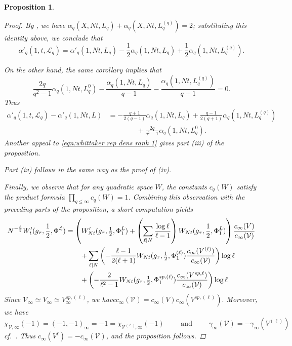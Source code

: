 \documentclass[reqno,oneside]{amsart}
\theoremstyle{plain}
\newtheorem{proposition}[theorem]{Proposition}
\theoremstyle{remark}
\numberwithin{theorem}{section}
\newcommand{\calL}{\mathcal L}
\newcommand{\calV}{\mathcal V}
\begin{document}
\begin{proposition}
\begin{proof}
			By \cite[Corollary 8.2]{YangLocal}, we have $\alpha_q(X, Nt, L_q) + \alpha_q(X, Nt, L_q^{(q)}) = 2$; substituting this identity above, we conclude that
			\begin{equation}
			\alpha'_q(1, t, \calL_q) = \alpha' _q(1, Nt, L_q) - \frac12 \alpha_q(1, Nt, L_q) + \frac12 \alpha_q(1, Nt, L^{(q)}_q).
			\end{equation}
			
			On the other hand, the same corollary implies that
			\begin{equation}
			\frac{2q }{q^2-1} \alpha_q(1, Nt, L^0_q) -  \frac{\alpha_q(1, Nt, L_q )}{q-1} -  \frac{\alpha_q(1, Nt, L_q^{(q)})}{q+1} = 0.
			\end{equation}
			Thus
			\begin{align}
			\alpha'_q(1, t, \calL_q) - \alpha'_q(1, Nt, L)  &= - \frac{ q+1}{2(q-1)} \alpha_q(1, Nt, L_q) + \frac{q-1}{2(q+1)} \alpha_q(1, Nt, L^{(q)}_q) \\
			& \qquad\qquad  + 	\frac{2q }{q^2-1} \alpha_q(1, Nt, L^0_q).
			\end{align}
			Another appeal to \eqref{eqn:whittaker rep dens rank 1} gives part \textit{(iii)} of the proposition.
			
			Part \textit{(iv)} follows in the same way as the proof of (iv).
			
			Finally, we observe that for any quadratic space $W$, the constants $c_q(W)$ satisfy the product formula $\prod_{q \leq \infty} c_q(W) = 1$. Combining this observation with the preceding parts of the proposition, a short computation yields
			\begin{align}
			N^{-\frac32} W_{t}'(g_{\tau}, \frac12, \Phi^{\calL}) &= \left( W_{Nt}'(g_{\tau}, \tfrac12, \Phi^L_1) + \left( \sum_{\ell|N} \frac{\log \ell }{\ell-1}  \notag \right)W_{Nt}(g_{\tau}, \frac12, \Phi^L_1) \right) \frac{c_{\infty}(V)}{c_{\infty}(\calV)} \\
			& \qquad  + \sum_{\ell|N} \left(  - \frac{\ell-1}{2(\ell+1)} W_{Nt}(g_{\tau}, \tfrac12, \Phi^{(\ell)}_1) \frac{c_{\infty}(V^{(\ell)})}{c_{\infty}(\calV)}  \right) \log \ell \notag \\
			& \qquad+ \left( - \frac{2}{\ell^2 -1 } W_{Nt}(g_{\tau}, \tfrac12, \Phi^{sp, (\ell)}_1) \frac{c_{\infty}(V^{sp,\ell})}{c_{\infty}(\calV)} \right) \log \ell
			\end{align}
			Since $\calV_{\infty} \simeq V_{\infty} \simeq V^{sp, (\ell)}_{\infty}$, we have$c_{\infty}(\calV) = c_{\infty}(V)c_{\infty}(V^{sp, (\ell)}) . $
			Moreover,  we have
			\begin{equation}
			\chi_{\calV, \infty}(-1) = (-1, -1 )_{\infty} = -1 = \chi_{\calV^{(\ell)}, \infty}(-1) \qquad \text{ and } \qquad \gamma_{\infty}(\calV) = - \gamma_{\infty}(V^{(\ell)})
			\end{equation}
			cf.\ \cite[p. 330]{KRYbook}. Thus $c_{\infty}(V^{\ell}) = - c_{\infty}(\calV)$, and the proposition follows.
			
		\end{proof}
	\end{proposition}
	
\end{document}
